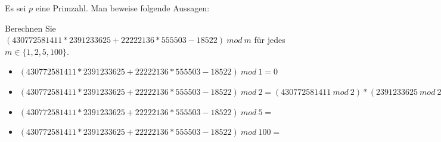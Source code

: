 \documentclass[10pt, a4paper]{exam}
\begin{document}
\begin{questions}

    \question Es sei $p$ eine Primzahl. Man beweise folgende Aussagen:

    \question Berechnen Sie $(430772581411 * 2391233625 + 22222136 * 555503 - 18522)\ mod\ m$ für jedes $m\in\{1, 2, 5, 100\}$.
    \begin{solution}
        \begin{itemize}
            \item $(430772581411 * 2391233625 + 22222136 * 555503 - 18522)\ mod\ 1 = 0$
            \item $(430772581411 * 2391233625 + 22222136 * 555503 - 18522)\ mod\ 2 = (430772581411\ mod\ 2)*(2391233625\ mod\ 2 )+(22222136\ mod\ 2)*(555503)\ mod\ 2 -(18522\ mod\ 2 )$
            \item $(430772581411 * 2391233625 + 22222136 * 555503 - 18522)\ mod\ 5 =$
            \item $(430772581411 * 2391233625 + 22222136 * 555503 - 18522)\ mod\ 100 =$
        \end{itemize}
    \end{solution}


\end{questions}
\end{document}
